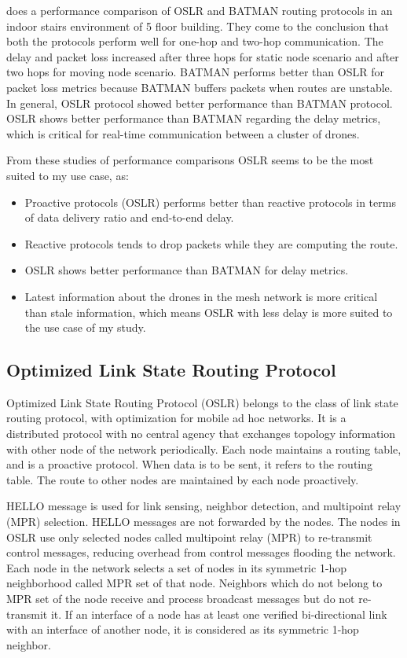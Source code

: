  does a performance comparison of OSLR and BATMAN routing protocols in an indoor stairs environment of 5 floor building. They come to the conclusion that both the protocols perform well for one-hop and two-hop communication. The delay and packet loss increased after three hops for static node scenario and after two hops for moving node scenario. BATMAN performs better than OSLR for packet loss metrics because BATMAN buffers packets when routes are unstable. In general, OSLR protocol showed better performance than BATMAN protocol. OSLR shows better performance than BATMAN regarding the delay metrics, which is critical for real-time communication between a cluster of drones.

From these studies of performance comparisons OSLR seems to be the most suited to my use case, as:
\begin{itemize}
	\item Proactive protocols (OSLR) performs better than reactive protocols in terms of data delivery ratio and end-to-end delay.
	\item Reactive protocols tends to drop packets while they are computing the route.
	\item OSLR shows better performance than BATMAN for delay metrics.
	\item Latest information about the drones in the mesh network is more critical than stale information, which means OSLR with less delay is more suited to the use case of my study.
\end{itemize}

\subsection{Optimized Link State Routing Protocol}

Optimized Link State Routing Protocol (OSLR) belongs to the class of link state routing protocol, with optimization for mobile ad hoc networks.  It is a distributed protocol with no central agency that exchanges topology information with other node of the network periodically. Each node maintains a routing table, and is a proactive protocol. When data is to be sent, it refers to the routing table. The route to other nodes are maintained by each node proactively. 

HELLO message is used for link sensing, neighbor detection, and multipoint relay (MPR) selection. HELLO messages are not forwarded by the nodes. The nodes in OSLR use only selected nodes called multipoint relay (MPR) to re-transmit control messages, reducing overhead from control messages flooding the network. Each node in the network selects a set of nodes in its symmetric 1-hop neighborhood called MPR set of that node. Neighbors which do not belong to MPR set of the node receive and process broadcast messages but do not re-transmit it. If an interface of a node has at least one verified bi-directional link with an interface of another node, it is considered as its symmetric 1-hop neighbor. 

